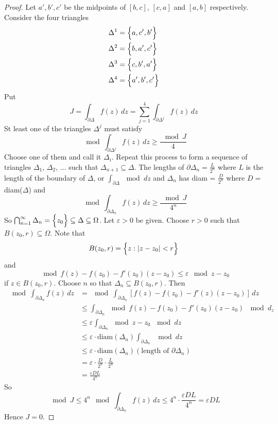 \documentclass[12pt]{article}
\begin{document}
\begin{proof} Let $a',b',c'$ be the midpoints of $[b,c]$, $[c,a]$ and $[a,b]$ respectively. Consider the four triangles $$ \begin{aligned} \Delta^1 &= \Big\{ a, c', b' \Big\} \\ \Delta^2 &= \Big\{ b, a', c' \Big\} \\ \Delta^3 &= \Big\{ c, b', a' \Big\} \\ \Delta^4 &= \Big\{ a',b',c' \Big\} \end{aligned} $$ Put $$J  = \int_{\partial \Delta} f(z) \, dz = \sum_{j=1}^4 \int_{\partial \Delta^j} f(z) \, dz $$ St least one of the triangles $\Delta^j$ must satisfy $$\mod{\int_{\partial \Delta^j} f(z) \, dz} \geq \frac{\mod{J}}{4} $$ Choose one of them and call it $\Delta_i$. Repeat this process to form a sequence of triangles $\Delta_1$, $\Delta_2$, $\dots$ such that $\Delta_{n+1} \subseteq \Delta$. The lengths of $\partial \Delta_n = \frac{L}{2^n}$ where $L$ is the length of the boundary of $\Delta$, or $\int_{\partial \Delta} \mod{dz}$ and $\Delta_n$ has diam = $\frac{D}{2^n}$ where $D = $ diam($\Delta$) and $$ \mod{\int_{\partial \Delta_n} f(z) \, dz} \geq \frac{\mod{J}}{4^n}$$ So $\bigcap_{n=1}^\infty \Delta_n = \Big\{ z_0 \Big\} \subseteq \Delta \subseteq \Omega$. Let $\varepsilon > 0$ be given. Choose $r > 0$ such that $B(z_0,r) \subseteq \Omega$. Note that $$ B(z_0, r) = \Big\{ z: \abs{z-z_0} < r \Big\} $$ and $$ \mod{f(z) - f(z_0) - f'(z_0)(z-z_0)} \leq \varepsilon \mod{z-z_0} $$ if $z \in B(z_0,r)$. Choose $n$ so that $\Delta_n \subseteq B(z_0,r)$. Then $$\begin{aligned} \mod{\int_{\partial \Delta_n} f(z) \, dz} &= \mod{ \int_{\partial \Delta_n} [f(z) - f(z_0) - f'(z)(z-z_0)] \, dz} \\ &\leq \int_{\partial \Delta_n} \mod{f(z) - f(z_0) - f'(z_0)(z-z_0)} \, \mod{d_z} \\ &\leq \varepsilon \int_{\partial \Delta_n} \mod{z-z_0} \, \mod{dz} \\ &\leq \varepsilon \cdot \text{diam}(\Delta_n) \int_{\partial \Delta_n} \, \mod{dz} \\ &\leq \varepsilon \cdot \text{diam}(\Delta_n)(\text{length of }\partial \Delta_n) \\ &= \varepsilon \cdot \frac{D}{2^n} \cdot \frac{L}{2^n} \\ &= \frac{\varepsilon DL}{4^n} \end{aligned} $$ So $$\mod{J} \leq 4^n \mod{\int_{\partial \Delta_n} f(z)\, dz} \leq 4^n \cdot \frac{\varepsilon DL}{4^n} = \varepsilon DL $$ Hence $J = 0$. \end{proof} 
\end{document}
